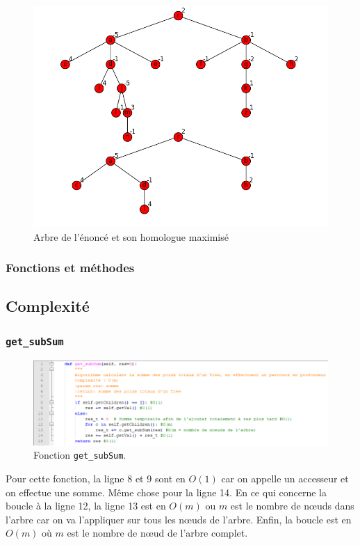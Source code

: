 \documentclass[a4papper]{article}
\begin{document}
\begin{figure}[h!]
	\centering
	\includegraphics[width=\linewidth]{Arbre.png}
	\caption{Arbre de l'énoncé et son homologue maximisé}
\end{figure}
		\subsubsection{Fonctions et méthodes}
			
			
	\subsection{Complexité}
		\subsubsection{\texttt{get\_subSum}}
			\begin{figure}[h!]
				\centering
				\includegraphics[width=\linewidth]{get_subSum.png}
				\caption{Fonction \texttt{get\_subSum}.}
			\end{figure}	
		
			Pour cette fonction, la ligne 8 et 9 sont en $O(1)$ car on appelle un accesseur et on effectue une somme. Même chose pour la ligne 14. En ce qui concerne la boucle à la ligne 12, la ligne 13 est en $O(m)$ ou $m$ est le nombre de nœuds dans l'arbre car on va l'appliquer sur tous les nœuds de l'arbre. Enfin, la boucle est en $O(m)$ où $m$ est le nombre de nœud de l'arbre complet. 
\end{document}
